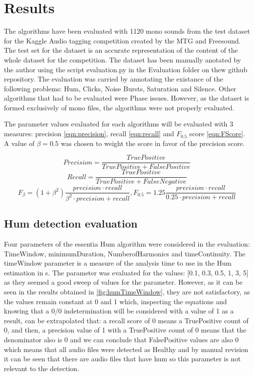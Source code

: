 
\chapter{Results}

The algorithms have been evaluated with 1120 mono sounds from the test dataset for the Kaggle Audio tagging competition created by the MTG and Freesound. The test set for the dataset is an accurate representation of the content of the whole dataset for the competition. The dataset has been manually anotated by the author using the script evaluation.py in the Evaluation folder on thew github repository. The evaluation was carried by annotating the existance of the following problems: Hum, Clicks, Noise Bursts, Saturation and Silence. Other algorithms that had to be evaluated were Phase issues. However, as the dataset is formed exclusively of mono files, the algorithms were not properly evaluated.

The parameter values evaluated for each algorithms will be evaluated with 3 measures: precision \ref{eqn:precision}, recall \ref{eqn:recall} and $F_{0.5}$ score \ref{eqn:FScore}. A value of $\beta=0.5$ was chosen to weight the score in favor of the precision score.

\begin{equation}\label{eqn:precision}
	Precision = \frac{TruePositive}{TruePositive + FalsePositive}
\end{equation}
\begin{equation}\label{eqn:recall}
	Recall = \frac{TruePositive}{TruePositive + FalseNegative}
\end{equation}
\begin{equation}\label{eqn:FScore}
	F_{\beta} = (1+\beta^2)\frac{precision \cdot recall}{\beta^2 \cdot precision + recall}, F_{0.5} = 1.25\frac{precision \cdot recall}{0.25 \cdot precision + recall}
\end{equation}

\section{Hum detection evaluation}
Four parameters of the essentia Hum algorithm were considered in the evaluation: TimeWindow, minimumDuration, NumberofHarmonics and timeContinuity. The timeWindow parameter is a measure of the analysis time to use in the Hum estimation in s. The parameter was evaluated for the values: [0.1, 0.3, 0.5, 1, 3, 5] as they seemed a good sweep of values for the parameter. However, as it can be seen in the results obtained in \ref{fig:humTimeWindow}, they are not satisfactory, as the values remain constant at 0 and 1 which, inspecting the equations and knowing that a 0/0 indetermination will be considered with a value of 1 as a result, can be extrapolated that: a recall score of 0 means a TruePositive count of 0, and then, a precision value of 1 with a TruePositive count of 0 means that the denominator also is 0 and we can conclude that FalsePositive values are also 0 which means that all audio files were detected as Healthy and by manual revision it can be seen that there are audio files that have hum so this parameter is not relevant to the detection.


